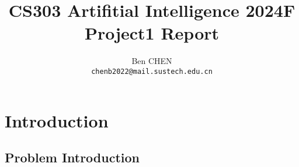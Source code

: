 \documentclass{article}
\title{CS303 Artifitial Intelligence 2024F Project1 Report}
\author{Ben CHEN \\ \texttt{chenb2022@mail.sustech.edu.cn}}
\begin{document}
\maketitle

\section{Introduction}

\subsection{Problem Introduction}
\end{document}

